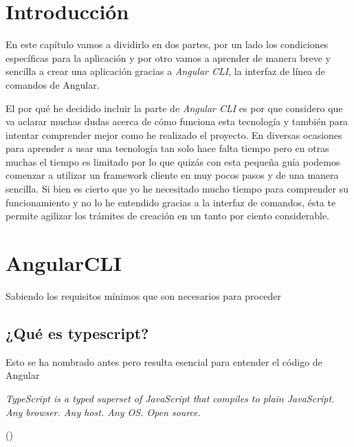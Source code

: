 
\section{Introducción}\label{introduccion-programador}
En este capítulo vamos a dividirlo en dos partes, por un lado los condiciones específicas para la aplicación y por otro vamos a aprender de manera breve y sencilla a crear una aplicación gracias a \emph{Angular CLI}, la interfaz de línea de comandos de Angular. 

El por qué he decidido incluir la parte de \emph{Angular CLI} es por que considero que va aclarar muchas dudas acerca de cómo funciona esta tecnología y también para intentar comprender mejor como he realizado el proyecto. En diversas ocasiones para aprender a usar una tecnología tan solo hace falta tiempo pero en otras muchas el tiempo es limitado por lo que quizás con esta pequeña guía podemos comenzar a utilizar un framework cliente en muy pocos pasos y de una manera sencilla. Si bien es cierto que yo he necesitado mucho tiempo para comprender su funcionamiento y no lo he entendido gracias a la interfaz de comandos, ésta te permite agilizar los trámites de creación en un tanto por ciento considerable.

\section{AngularCLI}\label{angularCLI}
Sabiendo los requisitos mínimos que son necesarios para proceder 

\subsection{¿Qué es typescript?}\label{typesript}
Esto se ha nombrado antes pero resulta esencial para entender el código de Angular

\begin{center}
    \begin{minipage}{0.9\linewidth}
        \vspace{5pt}%
        {\small
            \emph{TypeScript is a typed superset of JavaScript that compiles to plain JavaScript. Any browser. Any host. Any OS. Open source.}
        }
        \begin{flushright}
            (\cite{TypeScript Web})
        \end{flushright}
        \vspace{5pt}%
    \end{minipage}
\end{center}

